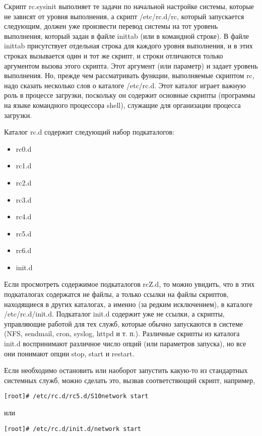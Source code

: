 Скрипт rc.sysinit выполняет те задачи по начальной настройке системы, которые не зависят от уровня выполнения, а скрипт /etc/rc.d/rc, который запускается следующим, должен уже произвести перевод системы на тот уровень выполнения, который задан в файле inittab (или в командной строке). В файле inittab присутствует отдельная строка для каждого уровня выполнения, и в этих строках вызывается один и тот же скрипт, и строки отличаются только аргументом вызова этого скрипта. Этот аргумент (или параметр) и задает уровень выполнения. Но, прежде чем рассматривать функции, выполняемые скриптом rc, надо сказать несколько слов о каталоге /etc/rc.d. Этот каталог играет важную роль в процессе загрузки, поскольку он содержит основные скрипты (программы на языке командного процессора shell), служащие для организации процесса загрузки.

Каталог rc.d содержит следующий набор подкаталогов:
\begin{itemize}
\item rc0.d
\item rc1.d
\item rc2.d
\item rc3.d
\item rc4.d
\item rc5.d
\item rc6.d
\item init.d
\end{itemize}

Если просмотреть содержимое подкаталогов rcZ.d, то можно увидить, что в этих подкаталогах содержатся не файлы, а только ссылки на файлы скриптов, находящиеся в других каталогах, а именно (за редким исключением), в каталоге /etc/rc.d/init.d. Подкаталог init.d содержит уже не ссылки, а скрипты, управляющие работой для тех служб, которые обычно запускаются в системе (NFS, sendmail, cron, syslog, httpd и т. п.). Различные скрипты из каталога init.d воспринимают различное число опций (или параметров запуска), но все они понимают опции stop, start и restart.

Если необходимо остановить или наоборот запустить какую-то из стандартных системных служб, можно сделать это, вызвав соответствющий скрипт, например,

\begin{Verbatim}[frame=single]
[root]# /etc/rc.d/rc5.d/S10network start
\end{Verbatim}

или

\begin{Verbatim}[frame=single]
[root]# /etc/rc.d/init.d/network start
\end{Verbatim}

